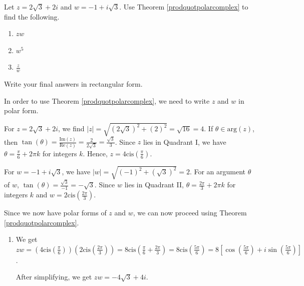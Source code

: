 \documentclass{ximera}
\begin{document}
\begin{example}  \label{polararithmeticex} Let $z = 2\sqrt{3} + 2i$ and $w = -1 + i\sqrt{3}$.  Use Theorem \ref{prodquotpolarcomplex} to find the following.

\begin{enumerate}

\item $zw$

\item  $w^5$

\item $\frac{z}{w}$

\end{enumerate}

Write your final answers in rectangular form.

 
\begin{explanation}  In order to use Theorem \ref{prodquotpolarcomplex}, we need to write $z$ and $w$ in polar form.

 

  For $z=2\sqrt{3} + 2i$, we find $|z| = \sqrt{(2\sqrt{3})^2 + (2)^2} = \sqrt{16} = 4$.  If $\theta \in \text{arg}(z)$, then  $\tan(\theta) = \frac{\text{Im}(z)}{\text{Re}(z)} = \frac{2}{2\sqrt{3}} = \frac{\sqrt{3}}{3}$.  Since $z$ lies in Quadrant I, we have $\theta = \frac{\pi}{6} + 2\pi k$ for integers $k$.  Hence, $z = 4 \text{cis}\left(\frac{\pi}{6}\right)$. 
  
   
  
  For $w = -1 + i\sqrt{3}$, we have $|w| = \sqrt{(-1)^2+(\sqrt{3})^2} = 2$.  For an argument $\theta$ of $w$,  $\tan(\theta) = \frac{\sqrt{3}}{-1} = -\sqrt{3}$.  Since $w$ lies in Quadrant II,  $\theta = \frac{2\pi}{3} + 2\pi k$ for integers $k$ and $w = 2\text{cis}\left(\frac{2\pi}{3}\right)$.  
  
   
  
  Since we now have polar forms of $z$ and $w$, we can now proceed using Theorem \ref{prodquotpolarcomplex}.
  
  \begin{enumerate}

\item  We get $zw = \left(4 \text{cis}\left(\frac{\pi}{6}\right)\right) \left(2\text{cis}\left(\frac{2\pi}{3}\right)\right) = 8\text{cis}\left(\frac{\pi}{6} + \frac{2\pi}{3}\right) = 8\text{cis}\left(\frac{5\pi}{6}\right) = 8\left[ \cos\left(\frac{5\pi}{6}\right) + i\sin\left(\frac{5\pi}{6}\right) \right]$. 

 

 After simplifying, we get $zw = -4\sqrt{3} + 4i$.


\end{enumerate}
\end{explanation}
\end{example}
\end{document}
